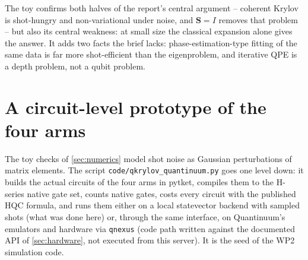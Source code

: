\documentclass[11pt,a4paper]{article}
\newcommand{\report}{the report}
\newcommand{\takeaway}[1]{\par\smallskip\noindent{\bfseries\textcolor{keyblue}{Takeaway.}} #1\par\smallskip}
\begin{document}
\takeaway{The toy confirms both halves of \report's central argument -- coherent Krylov is shot-hungry and non-variational under noise, and $\mathbf S=I$ removes that problem -- but also its central weakness: at small size the classical expansion alone gives the answer. It adds two facts the brief lacks: phase-estimation-type fitting of the same data is far more shot-efficient than the eigenproblem, and iterative QPE is a depth problem, not a qubit problem.}

\section{A circuit-level prototype of the four arms}\label{sec:code}
The toy checks of \cref{sec:numerics} model shot noise as Gaussian perturbations of matrix elements. The script \texttt{code/qkrylov\_quantinuum.py} goes one level down: it builds the actual circuits of the four arms in pytket, compiles them to the H-series native gate set, counts native gates, costs every circuit with the published HQC formula, and runs them either on a local statevector backend with sampled shots (what was done here) or, through the same interface, on Quantinuum's emulators and hardware via \texttt{qnexus} (code path written against the documented API of \cref{sec:hardware}, not executed from this server). It is the seed of the WP2 simulation code.
\end{document}
